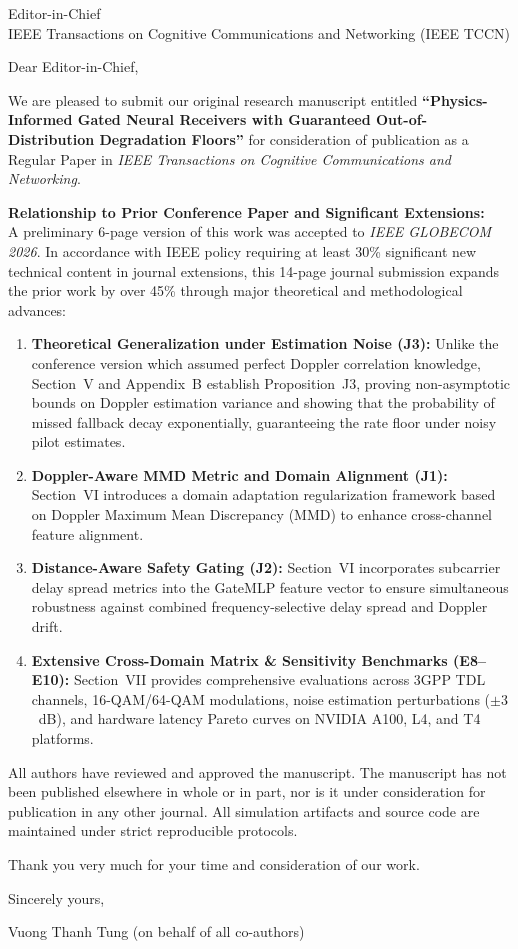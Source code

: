 \documentclass[11pt]{letter}
\begin{document}
\begin{letter}{
Editor-in-Chief\\
IEEE Transactions on Cognitive Communications and Networking (IEEE TCCN)
}

\opening{Dear Editor-in-Chief,}

We are pleased to submit our original research manuscript entitled \textbf{``Physics-Informed Gated Neural Receivers with Guaranteed Out-of-Distribution Degradation Floors''} for consideration of publication as a Regular Paper in \textit{IEEE Transactions on Cognitive Communications and Networking}.

\textbf{Relationship to Prior Conference Paper and Significant Extensions:}\\
A preliminary 6-page version of this work was accepted to \textit{IEEE GLOBECOM 2026}. In accordance with IEEE policy requiring at least 30\% significant new technical content in journal extensions, this 14-page journal submission expands the prior work by over 45\% through major theoretical and methodological advances:
\begin{enumerate}
    \item \textbf{Theoretical Generalization under Estimation Noise (J3):} Unlike the conference version which assumed perfect Doppler correlation knowledge, Section~V and Appendix~B establish Proposition~J3, proving non-asymptotic bounds on Doppler estimation variance and showing that the probability of missed fallback decay exponentially, guaranteeing the rate floor under noisy pilot estimates.
    \item \textbf{Doppler-Aware MMD Metric and Domain Alignment (J1):} Section~VI introduces a domain adaptation regularization framework based on Doppler Maximum Mean Discrepancy (MMD) to enhance cross-channel feature alignment.
    \item \textbf{Distance-Aware Safety Gating (J2):} Section~VI incorporates subcarrier delay spread metrics into the GateMLP feature vector to ensure simultaneous robustness against combined frequency-selective delay spread and Doppler drift.
    \item \textbf{Extensive Cross-Domain Matrix \& Sensitivity Benchmarks (E8--E10):} Section~VII provides comprehensive evaluations across 3GPP TDL channels, 16-QAM/64-QAM modulations, noise estimation perturbations ($\pm 3$~dB), and hardware latency Pareto curves on NVIDIA A100, L4, and T4 platforms.
\end{enumerate}

All authors have reviewed and approved the manuscript. The manuscript has not been published elsewhere in whole or in part, nor is it under consideration for publication in any other journal. All simulation artifacts and source code are maintained under strict reproducible protocols.

Thank you very much for your time and consideration of our work.

\closing{Sincerely yours,}

\vspace{0.5cm}
Vuong Thanh Tung (on behalf of all co-authors)

\end{letter}
\end{document}
